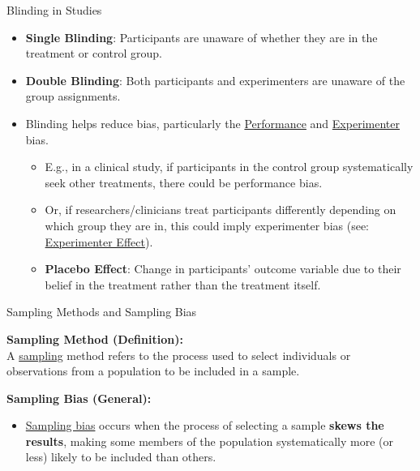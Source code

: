 \documentclass[handout]{beamer} %
\begin{document}
\begin{frame}{Blinding in Studies}
    \begin{itemize}
        \item \textbf{Single Blinding}: Participants are unaware of whether they are in the treatment or control group.
        \item \textbf{Double Blinding}: Both participants and experimenters are unaware of the group assignments. \pause %
        \item Blinding helps reduce bias, particularly the \href{https://catalogofbias.org/biases/performance-bias/}{Performance} and \href{https://dictionary.apa.org/experimenter-bias}{Experimenter} bias. \pause %
        \begin{itemize}
        \item E.g., in a clinical study, if participants in the control group systematically seek other treatments, there could be performance bias.
        \item Or, if researchers/clinicians treat participants differently depending on which group they are in, this could imply experimenter bias (see: \href{https://dictionary.apa.org/experimenter-effect}{Experimenter Effect}).
        \item  \textbf{Placebo Effect}: Change in participants' outcome variable due to their belief in the treatment rather than the treatment itself.
        \end{itemize}
    \end{itemize}
\end{frame}


\begin{frame}{Sampling Methods and Sampling Bias}

    \textbf{Sampling Method (Definition):} \\
    A \href{https://dictionary.apa.org/sampling}{sampling} method refers to the process used to select individuals or observations from a population to be included in a sample. 
    \newline

    \textbf{Sampling Bias (General):} 
    \begin{itemize}
        \item 
        \href{https://dictionary.apa.org/sampling-bias}{Sampling bias} occurs when the process of selecting a sample \textbf{skews the results}, making some members of the population systematically more (or less) likely to be included than others.
    \end{itemize}

\end{frame}
\end{document}
